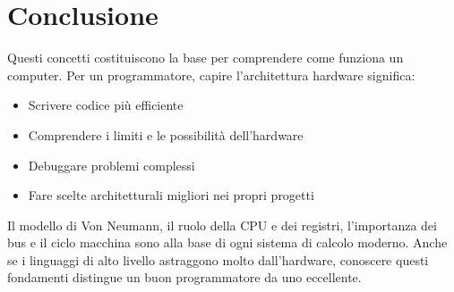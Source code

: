 \documentclass[12pt,a4paper]{article}
\begin{document}
\section{Conclusione}
Questi concetti costituiscono la base per comprendere come funziona un computer. Per un programmatore, capire l'architettura hardware significa:

\begin{itemize}
    \item Scrivere codice più efficiente
    \item Comprendere i limiti e le possibilità dell'hardware
    \item Debuggare problemi complessi
    \item Fare scelte architetturali migliori nei propri progetti
\end{itemize}

Il modello di Von Neumann, il ruolo della CPU e dei registri, l'importanza dei bus e il ciclo macchina sono alla base di ogni sistema di calcolo moderno. Anche se i linguaggi di alto livello astraggono molto dall'hardware, conoscere questi fondamenti distingue un buon programmatore da uno eccellente.
\end{document}
